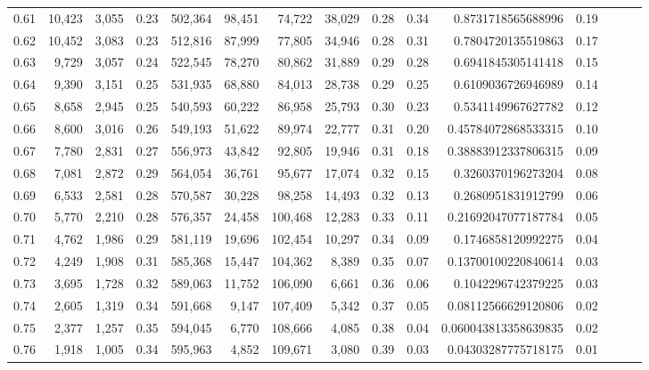\begin{tabular}{rrrrrrrrrrrrrrr}
0.61 &  10,423 &  3,055 &  0.23 &  502,364 &   98,451 &   74,722 &   38,029 &  0.28 &  0.34 &      0.8731718565688996 &      0.19 \\
0.62 &  10,452 &  3,083 &  0.23 &  512,816 &   87,999 &   77,805 &   34,946 &  0.28 &  0.31 &      0.7804720135519863 &      0.17 \\
0.63 &   9,729 &  3,057 &  0.24 &  522,545 &   78,270 &   80,862 &   31,889 &  0.29 &  0.28 &      0.6941845305141418 &      0.15 \\
0.64 &   9,390 &  3,151 &  0.25 &  531,935 &   68,880 &   84,013 &   28,738 &  0.29 &  0.25 &      0.6109036726946989 &      0.14 \\
0.65 &   8,658 &  2,945 &  0.25 &  540,593 &   60,222 &   86,958 &   25,793 &  0.30 &  0.23 &      0.5341149967627782 &      0.12 \\
0.66 &   8,600 &  3,016 &  0.26 &  549,193 &   51,622 &   89,974 &   22,777 &  0.31 &  0.20 &     0.45784072868533315 &      0.10 \\
0.67 &   7,780 &  2,831 &  0.27 &  556,973 &   43,842 &   92,805 &   19,946 &  0.31 &  0.18 &     0.38883912337806315 &      0.09 \\
0.68 &   7,081 &  2,872 &  0.29 &  564,054 &   36,761 &   95,677 &   17,074 &  0.32 &  0.15 &      0.3260370196273204 &      0.08 \\
0.69 &   6,533 &  2,581 &  0.28 &  570,587 &   30,228 &   98,258 &   14,493 &  0.32 &  0.13 &      0.2680951831912799 &      0.06 \\
0.70 &   5,770 &  2,210 &  0.28 &  576,357 &   24,458 &  100,468 &   12,283 &  0.33 &  0.11 &     0.21692047077187784 &      0.05 \\
0.71 &   4,762 &  1,986 &  0.29 &  581,119 &   19,696 &  102,454 &   10,297 &  0.34 &  0.09 &      0.1746858120992275 &      0.04 \\
0.72 &   4,249 &  1,908 &  0.31 &  585,368 &   15,447 &  104,362 &    8,389 &  0.35 &  0.07 &     0.13700100220840614 &      0.03 \\
0.73 &   3,695 &  1,728 &  0.32 &  589,063 &   11,752 &  106,090 &    6,661 &  0.36 &  0.06 &      0.1042296742379225 &      0.03 \\
0.74 &   2,605 &  1,319 &  0.34 &  591,668 &    9,147 &  107,409 &    5,342 &  0.37 &  0.05 &     0.08112566629120806 &      0.02 \\
0.75 &   2,377 &  1,257 &  0.35 &  594,045 &    6,770 &  108,666 &    4,085 &  0.38 &  0.04 &    0.060043813358639835 &      0.02 \\
0.76 &   1,918 &  1,005 &  0.34 &  595,963 &    4,852 &  109,671 &    3,080 &  0.39 &  0.03 &     0.04303287775718175 &      0.01 \\

\end{tabular}
